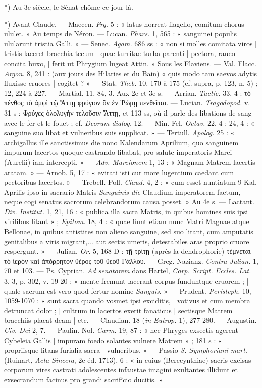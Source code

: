 \documentclass[a4paper, 11pt, oneside, polutonikogreek, french]{article}
\begin{document}
*) Au 3e siècle, le Sénat chôme ce jour-là.

*) Avant Claude. --- Maecen. \emph{Frg.} 5 : « latus horreat flagello, comitum chorus ululet. »  
Au temps de Néron. --- Lucan. \emph{Phars.} 1, 565 : « sanguinei populis ulularunt tristia Galli. » --- Senec. \emph{Agam.} 686 ss : « non si molles comitata viros | tristis laceret bracchia tecum | quae turritae turba parenti | pectora, rauco concita buxo, | ferit ut Phrygium lugeat Attin. »  
Sous les Flaviens. --- Val. Flacc. \emph{Argon}. 8, 241 : (aux jours des Hilaries et du Bain) « quis modo tam saevos adytis fluxisse cruores | cogitet ? » --- Stat. \emph{Theb.} 10, 170 à 175 (cf. supra, p. 123, n. 5) ; 12, 224 à 227. --- Martial. 11, 84, 3.  
Aux 2e et 3e s. --- Arrian. \emph{Tactic.} 33, 4 : τὸ πένθος τὸ ἀμφὶ τῷ Ἄττῃ φρύγιον ὃν ἐν Ῥώμῃ πενθεῖται. --- Lucian. \emph{Tragodopod.} v. 31 s : Φρύγες ὀλολυγὴν τελοῦσιν Ἄττῃ, et 113 ss, où il parle des libations de sang avec le fer et le fouet ; cf. \emph{Deorum dialog.} 12. --- Min. Fel. \emph{Octav.} 22, 4 ; 24, 4 : « sanguine suo libat et vulneribus suis supplicat. » --- Tertull. \emph{Apolog.} 25 : « archigallus ille sanctissimus die nono Kalendarum Aprilium, quo sanguinem impurum lacertos quoque castrando libabat, pro salute imperatoris Marci (Aurelii) iam intercepti. » --- \emph{Adv. Marcionem} 1, 13 : « Magnam Matrem lacertis aratam. » --- Arnob. 5, 17 : « evirati isti cur more lugentium caedant cum pectoribus lacertos. » --- Trebell. Poll. \emph{Claud.} 4, 2 : « cum esset nuntiatum 9 Kal. Aprilis ipso in sacrario Matris \emph{Sanguinis die} Claudium imperatorem factum, neque cogi senatus sacrorum celebrandorum causa posset. »  
Au 4e s. --- Lactant. \emph{Div. Institut.} 1, 21, 16 : « publica illa sacra Matris, in quibus homines suis ipsi virilibus litant » ; \emph{Epitom.} 18, 4 : « quae fiunt etiam nunc Matri Magnae atque Bellonae, in quibus antistites non alieno sanguine, sed suo litant, cum amputatis genitalibus a viris migrant,... aut sectis umeris, detestabiles aras proprio cruore respergunt. » --- Julian. \emph{Or.} 5, 168 D : τῇ τρίτῃ (après la dendrophorie) τέμνεται τὸ ἱερὸν καὶ ἀπόρρητον θέρος τοῦ θεοῦ Γάλλου. --- Greg. Nazianz. \emph{Contra Julian.} 1, 70 et 103. --- Ps. Cyprian. \emph{Ad senatorem} dans Hartel, \emph{Corp. Script. Eccles. Lat.} 3, 3, p. 302, v. 19-20 : « mente fremunt lacerant corpus funduntque cruorem ; | quale sacrum est vero quod fertur nomine \emph{Sanguis}. » --- Prudent. \emph{Peristeph.} 10, 1059-1070 : « sunt sacra quando vosmet ipsi exciditis, | votivus et cum membra detruncat dolor ; | cultrum in lacertos exerit fanaticus | sectisque Matrem bracchiis placat deam | etc. --- Claudian. 18 (\emph{in Eutrop.} 1), 277-280. --- Augustin. \emph{Civ. Dei} 2, 7. --- Paulin. Nol. \emph{Carm.} 19, 87 : « nec Phryges exsectis agerent Cybeleia Gallis | impuram foedo solantes vulnere Matrem » ; 181 s : « propriisque litans furialia sacra | vulneribus. » --- Passio \emph{S. Symphoriani mart.} (Ruinart, \emph{Acta Sincera}, 2e éd. 1713), 6 : « in cuius (Berecynthiae) sacris excisas corporum vires castrati adolescentes infaustae imagini exultantes illidunt et exsecrandum facinus pro grandi sacrifîcio ducitis. »
\end{document}
